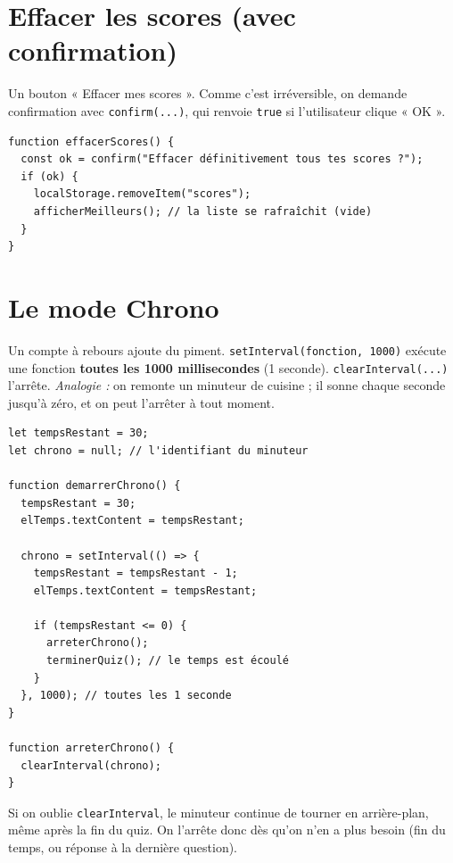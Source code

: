 \documentclass[11pt,a4paper]{article}
\newcommand{\code}[1]{\texttt{#1}}
\begin{document}
\section{Effacer les scores (avec confirmation)}

Un bouton « Effacer mes scores ». Comme c'est irréversible, on demande confirmation avec \code{confirm(...)}, qui renvoie \code{true} si l'utilisateur clique « OK ».

\begin{lstlisting}[style=js]
function effacerScores() {
  const ok = confirm("Effacer définitivement tous tes scores ?");
  if (ok) {
    localStorage.removeItem("scores");
    afficherMeilleurs(); // la liste se rafraîchit (vide)
  }
}
\end{lstlisting}

\section{Le mode Chrono}

Un compte à rebours ajoute du piment. \code{setInterval(fonction, 1000)} exécute une fonction \textbf{toutes les 1000 millisecondes} (1 seconde). \code{clearInterval(...)} l'arrête. \emph{Analogie :} on remonte un minuteur de cuisine ; il sonne chaque seconde jusqu'à zéro, et on peut l'arrêter à tout moment.

\begin{lstlisting}[style=js]
let tempsRestant = 30;
let chrono = null; // l'identifiant du minuteur

function demarrerChrono() {
  tempsRestant = 30;
  elTemps.textContent = tempsRestant;

  chrono = setInterval(() => {
    tempsRestant = tempsRestant - 1;
    elTemps.textContent = tempsRestant;

    if (tempsRestant <= 0) {
      arreterChrono();
      terminerQuiz(); // le temps est écoulé
    }
  }, 1000); // toutes les 1 seconde
}

function arreterChrono() {
  clearInterval(chrono);
}
\end{lstlisting}

\begin{attentionbox}
Si on oublie \code{clearInterval}, le minuteur continue de tourner en arrière-plan, même après la fin du quiz. On l'arrête donc dès qu'on n'en a plus besoin (fin du temps, ou réponse à la dernière question).
\end{attentionbox}
\end{document}

